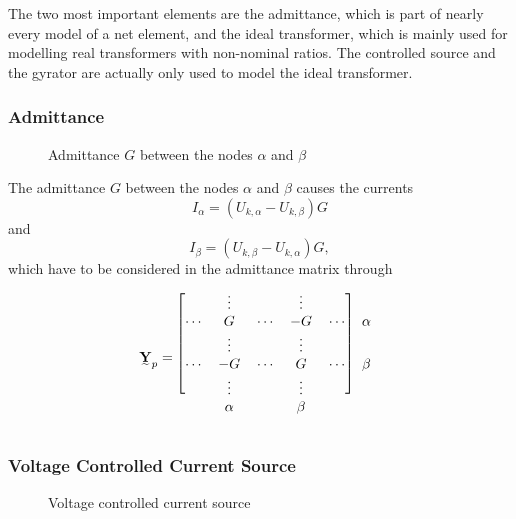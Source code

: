 The two most important elements are the admittance, which is part of nearly every model of a net element, and the ideal transformer, which is mainly used for modelling real transformers with non-nominal ratios. The controlled source and the gyrator are actually only used to model the ideal transformer.

\subsubsection{Admittance}

\begin{figure}
	\centering
	
	\caption{Admittance $G$ between the nodes $\alpha$ and $\beta$}
	\label{fig:admittance}
\end{figure}

The admittance $G$ between the nodes $\alpha$ and $\beta$  causes the currents
\begin{equation}
	I_\alpha = (U_{k,\alpha} - U_{k,\beta}) G
\end{equation}
and
\begin{equation}
	I_\beta = (U_{k,\beta} - U_{k,\alpha}) G,
\end{equation}
which have to be considered in the admittance matrix through
\begin{equation}
	\mat Y_p = 	
	\begin{blockarray}{cccccc}
		\begin{block}{[ccccc]c}
		 		& \vdots	&			& \vdots	&			& \\
		\cdots	& G			& \cdots	& -G		& \cdots	& \alpha \\
		 		& \vdots	&			& \vdots	&			& \\
		\cdots	& -G		& \cdots	& G			& \cdots	& \beta \\
		 		& \vdots	&			& \vdots	&			& \\
		\end{block}
				& \alpha	&			& \beta		&			& 
	\end{blockarray}
\end{equation}

\subsubsection{Voltage Controlled Current Source}

\begin{figure}
	\centering
	
	\caption{Voltage controlled current source}
	\label{fig:voltage_controlled_current_source}
\end{figure}

